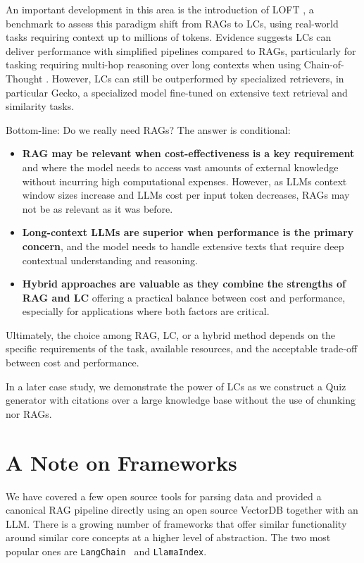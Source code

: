 An important development in this area is the introduction of LOFT , a benchmark to assess this paradigm shift from RAGs to LCs, using real-world tasks requiring context up to millions of tokens. Evidence suggests LCs can deliver performance with simplified pipelines compared to RAGs, particularly for tasking requiring multi-hop reasoning over long contexts when using Chain-of-Thought . However, LCs can still be outperformed by specialized retrievers, in particular Gecko, a specialized model fine-tuned on extensive text retrieval and similarity tasks.

Bottom-line: Do we really need RAGs? The answer is conditional:

\begin{itemize}
\item \textbf{RAG may be relevant when cost-effectiveness is a key requirement} and where the model needs to access vast amounts of external knowledge without incurring high computational expenses. However, as LLMs context window sizes increase and LLMs cost per input token decreases, RAGs may not be as relevant as it was before.
\item \textbf{Long-context LLMs are superior when performance is the primary concern}, and the model needs to handle extensive texts that require deep contextual understanding and reasoning.
\item \textbf{Hybrid approaches are valuable as they combine the strengths of RAG and LC} offering a practical balance between cost and performance, especially for applications where both factors are critical.
\end{itemize}
Ultimately, the choice among RAG, LC, or a hybrid method depends on the specific requirements of the task, available resources, and the acceptable trade-off between cost and performance.

In a later case study, we demonstrate the power of LCs as we construct a Quiz generator with citations over a large knowledge base without the use of chunking nor RAGs.

\section{A Note on Frameworks}

We have covered a few open source tools for parsing data and provided a canonical RAG pipeline directly using an open source VectorDB together with an LLM. There is a growing number of frameworks that offer similar functionality around similar core concepts at a higher level of abstraction. The two most popular ones are \texttt{LangChain}~ and \texttt{LlamaIndex}. 

